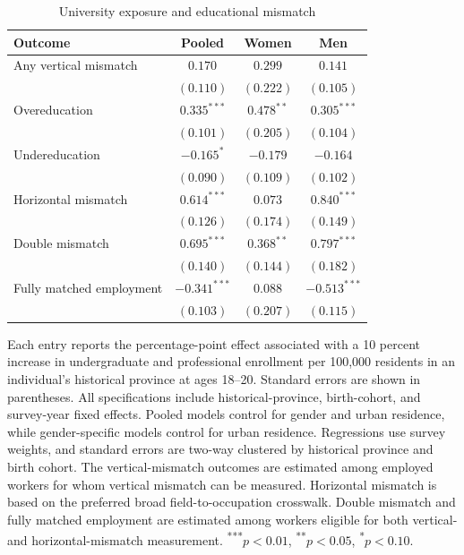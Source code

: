 \begin{table}[htbp]
  \centering
  \caption{University exposure and educational mismatch}
  \label{tab:mismatch}
  \begin{threeparttable}
  \begin{tabular}{lccc}
    \toprule
    Outcome & Pooled & Women & Men \\
    \midrule
    Any vertical mismatch     & $0.170$          & $0.299$          & $0.141$ \\
                              & $(0.110)$        & $(0.222)$        & $(0.105)$ \\
    Overeducation             & $0.335^{***}$    & $0.478^{**}$     & $0.305^{***}$ \\
                              & $(0.101)$        & $(0.205)$        & $(0.104)$ \\
    Undereducation            & $-0.165^{*}$     & $-0.179$         & $-0.164$ \\
                              & $(0.090)$        & $(0.109)$        & $(0.102)$ \\
    Horizontal mismatch       & $0.614^{***}$    & $0.073$          & $0.840^{***}$ \\
                              & $(0.126)$        & $(0.174)$        & $(0.149)$ \\
    Double mismatch           & $0.695^{***}$    & $0.368^{**}$     & $0.797^{***}$ \\
                              & $(0.140)$        & $(0.144)$        & $(0.182)$ \\
    Fully matched employment  & $-0.341^{***}$   & $0.088$          & $-0.513^{***}$ \\
                              & $(0.103)$        & $(0.207)$        & $(0.115)$ \\
    \bottomrule
  \end{tabular}
  \begin{tablenotes}[flushleft]
    \footnotesize
    \item Each entry reports the percentage-point effect associated with a 10 percent increase in undergraduate and professional enrollment per 100,000 residents in an individual's historical province at ages 18--20. Standard errors are shown in parentheses. All specifications include historical-province, birth-cohort, and survey-year fixed effects. Pooled models control for gender and urban residence, while gender-specific models control for urban residence. Regressions use survey weights, and standard errors are two-way clustered by historical province and birth cohort. The vertical-mismatch outcomes are estimated among employed workers for whom vertical mismatch can be measured. Horizontal mismatch is based on the preferred broad field-to-occupation crosswalk. Double mismatch and fully matched employment are estimated among workers eligible for both vertical- and horizontal-mismatch measurement. \textsuperscript{***}$p<0.01$, \textsuperscript{**}$p<0.05$, \textsuperscript{*}$p<0.10$.
  \end{tablenotes}
  \end{threeparttable}
\end{table}

